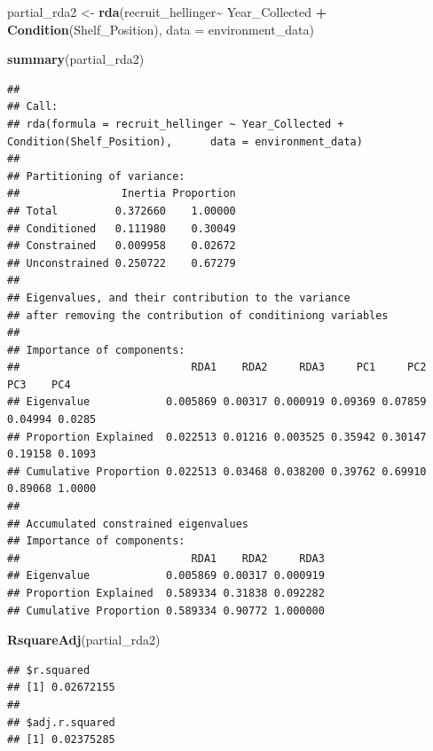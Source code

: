 \documentclass[
]{article}
\newenvironment{Shaded}{\begin{snugshade}}{\end{snugshade}}
\newcommand{\AttributeTok}[1]{\textcolor[rgb]{0.13,0.29,0.53}{#1}}
\newcommand{\FunctionTok}[1]{\textcolor[rgb]{0.13,0.29,0.53}{\textbf{#1}}}
\newcommand{\NormalTok}[1]{#1}
\newcommand{\OtherTok}[1]{\textcolor[rgb]{0.56,0.35,0.01}{#1}}
\newcommand{\SpecialCharTok}[1]{\textcolor[rgb]{0.81,0.36,0.00}{\textbf{#1}}}
\begin{document}
\begin{Shaded}
\begin{Highlighting}[]
\NormalTok{partial\_rda2 }\OtherTok{\textless{}{-}} \FunctionTok{rda}\NormalTok{(recruit\_hellinger}\SpecialCharTok{\textasciitilde{}}\NormalTok{ Year\_Collected }\SpecialCharTok{+} \FunctionTok{Condition}\NormalTok{(Shelf\_Position), }\AttributeTok{data =}\NormalTok{ environment\_data)}
\end{Highlighting}
\end{Shaded}

\begin{Shaded}
\begin{Highlighting}[]
\FunctionTok{summary}\NormalTok{(partial\_rda2)}
\end{Highlighting}
\end{Shaded}

\begin{verbatim}
## 
## Call:
## rda(formula = recruit_hellinger ~ Year_Collected + Condition(Shelf_Position),      data = environment_data) 
## 
## Partitioning of variance:
##                Inertia Proportion
## Total         0.372660    1.00000
## Conditioned   0.111980    0.30049
## Constrained   0.009958    0.02672
## Unconstrained 0.250722    0.67279
## 
## Eigenvalues, and their contribution to the variance 
## after removing the contribution of conditiniong variables
## 
## Importance of components:
##                           RDA1    RDA2     RDA3     PC1     PC2     PC3    PC4
## Eigenvalue            0.005869 0.00317 0.000919 0.09369 0.07859 0.04994 0.0285
## Proportion Explained  0.022513 0.01216 0.003525 0.35942 0.30147 0.19158 0.1093
## Cumulative Proportion 0.022513 0.03468 0.038200 0.39762 0.69910 0.89068 1.0000
## 
## Accumulated constrained eigenvalues
## Importance of components:
##                           RDA1    RDA2     RDA3
## Eigenvalue            0.005869 0.00317 0.000919
## Proportion Explained  0.589334 0.31838 0.092282
## Cumulative Proportion 0.589334 0.90772 1.000000
\end{verbatim}

\begin{Shaded}
\begin{Highlighting}[]
\FunctionTok{RsquareAdj}\NormalTok{(partial\_rda2)}
\end{Highlighting}
\end{Shaded}

\begin{verbatim}
## $r.squared
## [1] 0.02672155
## 
## $adj.r.squared
## [1] 0.02375285
\end{verbatim}
\end{document}
